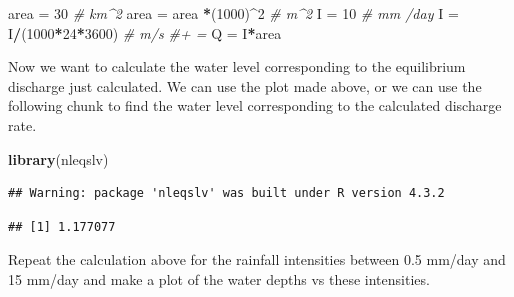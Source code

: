 \documentclass[
]{article}
\newenvironment{Shaded}{\begin{snugshade}}{\end{snugshade}}
\newcommand{\CommentTok}[1]{\textcolor[rgb]{0.56,0.35,0.01}{\textit{#1}}}
\newcommand{\ControlFlowTok}[1]{\textcolor[rgb]{0.13,0.29,0.53}{\textbf{#1}}}
\newcommand{\DecValTok}[1]{\textcolor[rgb]{0.00,0.00,0.81}{#1}}
\newcommand{\FunctionTok}[1]{\textcolor[rgb]{0.13,0.29,0.53}{\textbf{#1}}}
\newcommand{\NormalTok}[1]{#1}
\newcommand{\OtherTok}[1]{\textcolor[rgb]{0.56,0.35,0.01}{#1}}
\newcommand{\SpecialCharTok}[1]{\textcolor[rgb]{0.81,0.36,0.00}{\textbf{#1}}}
\begin{document}
\begin{Shaded}
\begin{Highlighting}[]
\NormalTok{area }\OtherTok{=} \DecValTok{30} \CommentTok{\# km\^{}2}
\NormalTok{area }\OtherTok{=}\NormalTok{ area }\SpecialCharTok{*}\NormalTok{(}\DecValTok{1000}\NormalTok{)}\SpecialCharTok{\^{}}\DecValTok{2} \CommentTok{\# m\^{}2}
\NormalTok{I }\OtherTok{=} \DecValTok{10} \CommentTok{\# mm /day}
\NormalTok{I }\OtherTok{=}\NormalTok{ I}\SpecialCharTok{/}\NormalTok{(}\DecValTok{1000}\SpecialCharTok{*}\DecValTok{24}\SpecialCharTok{*}\DecValTok{3600}\NormalTok{) }\CommentTok{\# m/s \#+ = }
\NormalTok{Q }\OtherTok{=}\NormalTok{ I}\SpecialCharTok{*}\NormalTok{area}
\end{Highlighting}
\end{Shaded}

Now we want to calculate the water level corresponding to the
equilibrium discharge just calculated. We can use the plot made above,
or we can use the following chunk to find the water level corresponding
to the calculated discharge rate.

\begin{Shaded}
\begin{Highlighting}[]
\FunctionTok{library}\NormalTok{(nleqslv)}
\end{Highlighting}
\end{Shaded}

\begin{verbatim}
## Warning: package 'nleqslv' was built under R version 4.3.2
\end{verbatim}

\begin{Shaded}
\end{Shaded}

\begin{verbatim}
## [1] 1.177077
\end{verbatim}

Repeat the calculation above for the rainfall intensities between 0.5
mm/day and 15 mm/day and make a plot of the water depths vs these
intensities.
\end{document}
